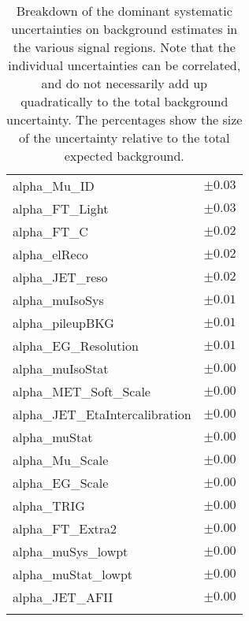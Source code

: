\begin{table}
\begin{center}
\begin{tabular*}{\textwidth}{@{\extracolsep{\fill}}lc}
alpha\_Mu\_ID         & $\pm 0.03$       \\
alpha\_FT\_Light         & $\pm 0.03$       \\
alpha\_FT\_C         & $\pm 0.02$       \\
alpha\_elReco         & $\pm 0.02$       \\
alpha\_JET\_reso         & $\pm 0.02$       \\
alpha\_muIsoSys         & $\pm 0.01$       \\
alpha\_pileupBKG         & $\pm 0.01$       \\
alpha\_EG\_Resolution         & $\pm 0.01$       \\
alpha\_muIsoStat         & $\pm 0.00$       \\
alpha\_MET\_Soft\_Scale         & $\pm 0.00$       \\
alpha\_JET\_EtaIntercalibration         & $\pm 0.00$       \\
alpha\_muStat         & $\pm 0.00$       \\
alpha\_Mu\_Scale         & $\pm 0.00$       \\
alpha\_EG\_Scale         & $\pm 0.00$       \\
alpha\_TRIG         & $\pm 0.00$       \\
alpha\_FT\_Extra2         & $\pm 0.00$       \\
alpha\_muSys\_lowpt         & $\pm 0.00$       \\
alpha\_muStat\_lowpt         & $\pm 0.00$       \\
alpha\_JET\_AFII         & $\pm 0.00$       \\
\noalign{\smallskip}\hline\noalign{\smallskip}
\end{tabular*}
\end{center}
\caption[Breakdown of uncertainty on background estimates]{
Breakdown of the dominant systematic uncertainties on background estimates in the various signal regions.
Note that the individual uncertainties can be correlated, and do not necessarily add up quadratically to 
the total background uncertainty. The percentages show the size of the uncertainty relative to the total expected background.
\label{table.results.bkgestimate.uncertainties.SR3L0b2}}
\end{table}
\clearpage
%